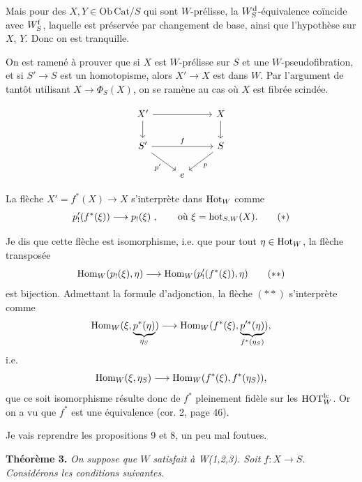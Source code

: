 Mais pour des $X, Y \in \mathrm{Ob}\,\mathrm{Cat}/S$ qui sont $W$-prélisse, la $W^{\mathrm{d}}_S$-équivalence coïncide avec $W^{\mathrm{f}}_S$, laquelle est préservée par changement de base, ainsi que l'hypothèse sur $X$, $Y$. Donc on est tranquille.

On est ramené à prouver que si $X$ est $W$-prélisse sur $S$ et une $W$-pseudofibration, et si $S' \longrightarrow S$ est un homotopisme, alors $X' \longrightarrow X$ est dans $W$. Par l'argument de tantôt utilisant $X \longrightarrow \Phi_S(X)$, on se ramène au cas où $X$ est fibrée scindée.


\[ \begin{tikzcd}
X' \arrow[rr] \arrow[d] & & X \arrow[d] \\
S' \arrow[rr, "f"] \arrow[dr, "p'"'] & & S \arrow[dl, "p"] \\
 & e &
\end{tikzcd} \]

La flèche $X' = f^*(X) \longrightarrow X$ s'interprète dans $\mathrm{Hot}_W$ comme
\[ p'_!(f^*(\xi)) \longrightarrow p_!(\xi) \ , \qquad \text{où } \xi = \mathrm{hot}_{S,W}(X). \tag*{$(*)$} \]

Je dis que cette flèche est isomorphisme, i.e. que pour tout $\eta \in \mathrm{Hot}_W$, la flèche transposée
\[ \mathrm{Hom}_W(p_!(\xi),\eta) \longrightarrow \mathrm{Hom}_W(p'_!(f^*(\xi)),\eta) \tag*{$(**)$} \]
est bijection. Admettant la formule d'adjonction, la flèche $(**)$ s'interprète comme
\[ \mathrm{Hom}_W(\xi,\underbrace{p^*(\eta)}_{\eta_S}) \longrightarrow \mathrm{Hom}_W(f^*(\xi),\underbrace{p'^*(\eta)}_{f^*(\eta_S)}), \]
i.e.
\[ \mathrm{Hom}_W(\xi,\eta_S) \longrightarrow \mathrm{Hom}_W(f^*(\xi),f^*(\eta_S)), \]
que ce soit isomorphisme résulte donc de $f^*$ pleinement fidèle sur les $\mathrm{HOT}^{\mathrm{lc}}_W$. Or on a vu que $f^*$ est une équivalence (cor. 2, page 46).

Je vais reprendre les propositions 9 et 8, un peu mal foutues.

\textbf{Théorème 3.} \textit{On suppose que $W$ satisfait à \textup{W(1,2,3)}. Soit $f : X \longrightarrow S$. Considérons les conditions suivantes.}

